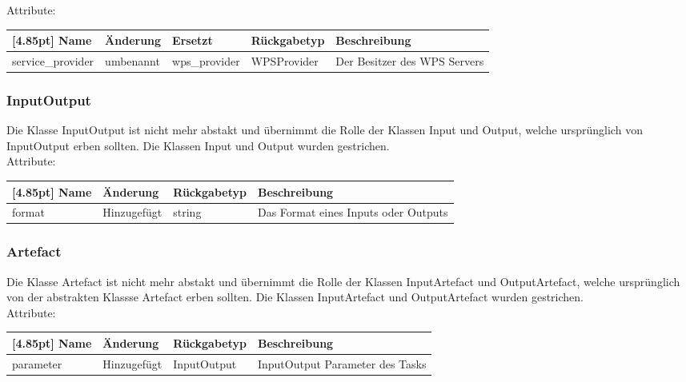 			Attribute:
			\begin{center}
				\setlength\tabcolsep{5pt}
				\renewcommand{\arraystretch}{1.5}
				
				\begin{tabularx}{\textwidth}{|l|l|l|l|X|}
					\hline
					\rowcolor[gray]{0.9}[4.85pt]
					Name & Änderung & Ersetzt & Rückgabetyp & Beschreibung \\ \hline 
					service\_provider & umbenannt & wps\_provider & WPSProvider & Der Besitzer des WPS Servers \\ \hline
					
				\end{tabularx}
			\end{center}

		\subsubsection{InputOutput} 
		Die Klasse InputOutput ist nicht mehr abstakt und übernimmt die Rolle der Klassen Input und Output, welche ursprünglich von InputOutput erben sollten. Die Klassen Input und Output wurden gestrichen. \\
			Attribute:
			\begin{center}
				\setlength\tabcolsep{5pt}
				\renewcommand{\arraystretch}{1.5}
				
				\begin{tabularx}{\textwidth}{|l|l|l|X|}
					\hline
					\rowcolor[gray]{0.9}[4.85pt]
					Name & Änderung & Rückgabetyp & Beschreibung \\ \hline 
					format & Hinzugefügt & string & Das Format eines Inputs oder Outputs \\ \hline
				\end{tabularx}
			\end{center}
			


		\subsubsection{Artefact} Die Klasse Artefact ist nicht mehr abstakt und übernimmt die Rolle der Klassen InputArtefact und OutputArtefact, welche ursprünglich von der abstrakten Klassse Artefact erben sollten. Die Klassen InputArtefact und OutputArtefact wurden gestrichen. \\

			Attribute:
			\begin{center}
				\setlength\tabcolsep{5pt}
				\renewcommand{\arraystretch}{1.5}
				
				\begin{tabularx}{\textwidth}{|l|l|l|X|}
					\hline
					\rowcolor[gray]{0.9}[4.85pt]
					Name & Änderung  & Rückgabetyp & Beschreibung \\ \hline 
					parameter & Hinzugefügt & InputOutput & InputOutput Parameter des Tasks \\ \hline
				\end{tabularx}
			\end{center}
